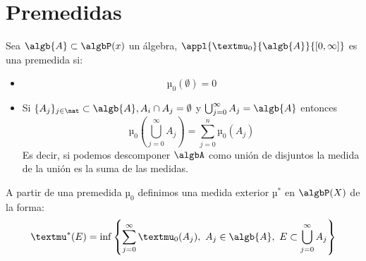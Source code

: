 \documentclass{apuntes}
\begin{document}
\section{Premedidas}
\begin{defn}[Premedida]
Sea $\algb{A} \subset \algbP(x)$ un álgebra, $\appl{µ_0}{\algb{A}}{[0, \infty]}$ es una premedida si:
\begin{itemize}
\item
\[µ_0(\emptyset)=0\]
\item Si $\{A_j\}_{j \in \nat} \subset \algb{A}, A_i \cap A_j = \emptyset$ y $\bigcup_{j=0}^{\infty}A_j = \algb{A}$ entonces
\[µ_0(\bigcup_{j=0}^{\infty}A_j) = \sum_{j=0}^{n}µ_0(A_j)\]
Es decir, si podemos descomponer $\algbA$ como unión de disjuntos la medida de la unión es la suma de las medidas.
\end{itemize}
\end{defn}

A partir de una premedida $µ_0$ definimos una medida exterior $µ^*$ en $\algbP(X)$ de la forma:
\[µ^*(E) = \inf \left\{\sum_{j=0}^{\infty} µ_0(A_j), \ A_j \in \algb{A}, \ E \subset \bigcup_{j=0}^{\infty}A_j\right\}\]
\end{document}
